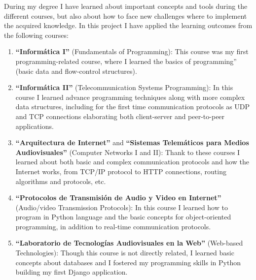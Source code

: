 \documentclass[a4paper, 12pt]{book}
\begin{document}
During my degree I have learned about important concepts and tools during the different courses,
but also about how to face new challenges where to implement the acquired knowledge.
In this project I have applied the learning outcomes from the following courses:
\begin{enumerate}
  \item \textbf{``Informática I''} (Fundamentals of Programming): This course was my first programming-related course,
  where I learned the basics of programming'' (basic data and flow-control structures).
  \item \textbf{``Informática II''} (Telecommunication Systems Programming): In this course I learned advance programming
  techniques along with more complex data structures, including for the first time communication protocols as UDP and TCP connections
  elaborating both client-server and peer-to-peer applications.
  \item \textbf{``Arquitectura de Internet''} and \textbf{``Sistemas Telemáticos para Medios Audiovisuales''} (Computer Networks I and II):
  Thank to these courses I learned about both basic and complex communication protocols and how the Internet works,
  from TCP/IP protocol to HTTP connections, routing algorithms and protocols, etc.
  \item \textbf{``Protocolos de Transmisión de Audio y Video en Internet''} (Audio/video Transmission Protocols):
  In this course I learned how to program in Python language and the basic concepts for object-oriented programming, in
  addition to real-time communication protocols.
  \item \textbf{``Laboratorio de Tecnologías Audiovisuales en la Web''} (Web-based Technologies): Though this course is not directly
  related, I learned basic concepts about databases and I fostered my programming skills in Python building my first Django
  application.
\end{enumerate}
\end{document}
